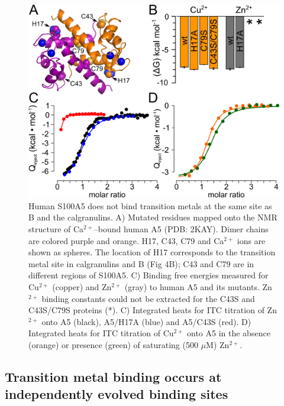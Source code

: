 \begin{figure}
\centering
	\includegraphics{ch3-fig6.png} 
\caption[Human S100A5 does not bind transition metals at the same site as B and the calgranulins]{Human S100A5 does not bind transition metals at the same site as B and the calgranulins. A) Mutated residues mapped onto the NMR structure of Ca$^{2+}$--bound human A5 (PDB: 2KAY). Dimer chains are colored purple and orange. H17, C43, C79 and Ca$^{2+}$ ions are shown as spheres. The location of H17 corresponds to the transition metal site in calgranulins and B (Fig 4B); C43 and C79 are in different regions of S100A5. C) Binding free energies measured for Cu$^{2+}$ (copper) and Zn$^{2+}$ (gray) to human A5 and its mutants. Zn$^{2+}$ binding constants could not be extracted for the C43S and C43S/C79S proteins (*). C) Integrated heats for ITC titration of Zn$^{2+}$ onto A5 (black), A5/H17A (blue) and A5/C43S (red). D) Integrated heats for ITC titration of Cu$^{2+}$ onto A5 in the absence (orange) or presence (green) of saturating (500 $\mu$M) Zn$^{2+}$.\label{samplefigure}}	
\end{figure}


\subsection{Transition metal binding occurs at independently evolved binding sites}

